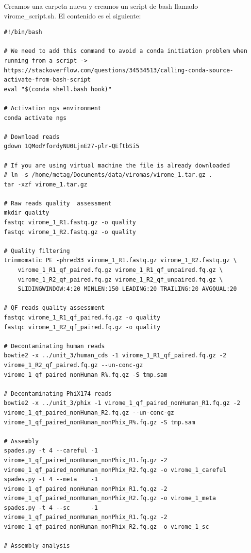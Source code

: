 Creamos una carpeta nueva y creamos un script de bash llamado virome\_script.sh. El contenido es el siguiente:

\begin{lstlisting}
#!/bin/bash

# We need to add this command to avoid a conda initiation problem when running from a script -> https://stackoverflow.com/questions/34534513/calling-conda-source-activate-from-bash-script
eval "$(conda shell.bash hook)"

# Activation ngs environment
conda activate ngs

# Download reads
gdown 1QModYfordyNU0LjnE27-plr-QEftbSi5

# If you are using virtual machine the file is already downloaded 
# ln -s /home/metag/Documents/data/viromas/virome_1.tar.gz .
tar -xzf virome_1.tar.gz

# Raw reads quality  assessment
mkdir quality
fastqc virome_1_R1.fastq.gz -o quality
fastqc virome_1_R2.fastq.gz -o quality

# Quality filtering
trimmomatic PE -phred33 virome_1_R1.fastq.gz virome_1_R2.fastq.gz \
    virome_1_R1_qf_paired.fq.gz virome_1_R1_qf_unpaired.fq.gz \
    virome_1_R2_qf_paired.fq.gz virome_1_R2_qf_unpaired.fq.gz \
    SLIDINGWINDOW:4:20 MINLEN:150 LEADING:20 TRAILING:20 AVGQUAL:20

# QF reads quality assessment
fastqc virome_1_R1_qf_paired.fq.gz -o quality
fastqc virome_1_R2_qf_paired.fq.gz -o quality

# Decontaminating human reads
bowtie2 -x ../unit_3/human_cds -1 virome_1_R1_qf_paired.fq.gz -2 virome_1_R2_qf_paired.fq.gz --un-conc-gz virome_1_qf_paired_nonHuman_R%.fq.gz -S tmp.sam

# Decontaminating PhiX174 reads
bowtie2 -x ../unit_3/phix -1 virome_1_qf_paired_nonHuman_R1.fq.gz -2 virome_1_qf_paired_nonHuman_R2.fq.gz --un-conc-gz virome_1_qf_paired_nonHuman_nonPhix_R%.fq.gz -S tmp.sam

# Assembly
spades.py -t 4 --careful -1 virome_1_qf_paired_nonHuman_nonPhix_R1.fq.gz -2 virome_1_qf_paired_nonHuman_nonPhix_R2.fq.gz -o virome_1_careful
spades.py -t 4 --meta    -1 virome_1_qf_paired_nonHuman_nonPhix_R1.fq.gz -2 virome_1_qf_paired_nonHuman_nonPhix_R2.fq.gz -o virome_1_meta
spades.py -t 4 --sc      -1 virome_1_qf_paired_nonHuman_nonPhix_R1.fq.gz -2 virome_1_qf_paired_nonHuman_nonPhix_R2.fq.gz -o virome_1_sc

# Assembly analysis


\end{lstlisting}
